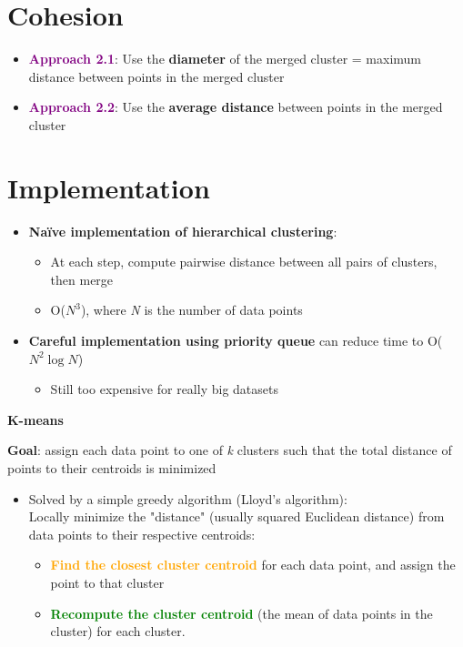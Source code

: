 \documentclass[11pt]{article}
\begin{document}
\section*{Cohesion}

\begin{itemize}
	\item \textcolor{purple}{\textbf{Approach 2.1}}: Use the \textbf{diameter} of the merged cluster = maximum distance between points in the merged cluster
	\item \textcolor{purple}{\textbf{Approach 2.2}}: Use the \textbf{average distance} between points in the merged cluster
\end{itemize}

\section*{Implementation}

\begin{itemize}
	\item \textbf{Naïve implementation of hierarchical clustering}:
		\begin{itemize}
			\item At each step, compute pairwise distance between all pairs of clusters, then merge
			\item O($N^{3}$), where \textit{N} is the number of data points
		\end{itemize}
	\item \textbf{Careful implementation using priority queue} can reduce time to O($N^{2} \log{N}$)
		\begin{itemize}
			\item Still too expensive for really big datasets
		\end{itemize}
\end{itemize}

\newpage

\begin{center}
  {\LARGE \textbf{K-means}}
\end{center}
\vspace{0.5cm}

\textbf{Goal}: assign each data point to one of \textit{k} clusters such that the total distance of points to their centroids is minimized

\begin{itemize}
	\item Solved by a simple greedy algorithm (Lloyd's algorithm): \\
	Locally minimize the "distance" (usually squared Euclidean distance) from data points to their respective centroids:
	\begin{itemize}
		\item \textbf{\textcolor{orange}{Find the closest cluster centroid}} for each data point, and assign the point to that cluster
		\item \textbf{\textcolor{green}{Recompute the cluster centroid}} (the mean of data points in the cluster) for each cluster. 
	\end{itemize}
\end{itemize}
\end{document}
